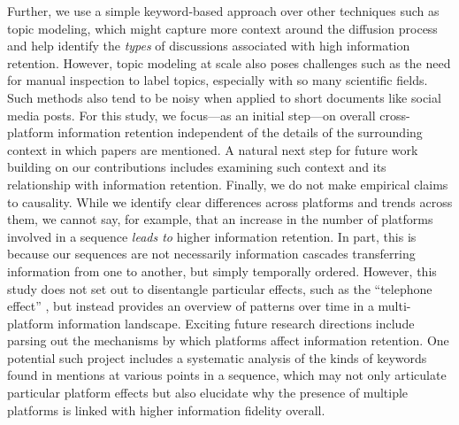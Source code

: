 \documentclass[letterpaper]{article} %
\begin{document}
Further, we use a simple keyword-based approach over other techniques such as topic modeling, which might capture more context around the diffusion process and help identify the \textit{types} of discussions associated with high information retention. However, topic modeling at scale also poses challenges such as the need for manual inspection to label topics, especially with so many scientific fields. Such methods also tend to be noisy when applied to short documents like social media posts. For this study, we focus---as an initial step---on overall cross-platform information retention independent of the details of the surrounding context in which papers are mentioned. A natural next step for future work building on our contributions includes examining such context and its relationship with information retention.  Finally, we do not make empirical claims to causality. While we identify clear differences across platforms and trends across them, we cannot say, for example, that an increase in the number of platforms involved in a sequence \emph{leads to} higher information retention. In part, this is because our sequences are not necessarily information cascades transferring information from one to another, but simply temporally ordered. However, this study does not set out to disentangle particular effects, such as the ``telephone effect'' \citep{ribeiroMessageDistortionInformation2019}, but instead provides an overview of patterns over time in a multi-platform information landscape. Exciting future research directions include parsing out the mechanisms by which platforms affect information retention. One potential such project includes a systematic analysis of the kinds of keywords found in mentions at various points in a sequence, which may not only articulate particular platform effects but also elucidate why the presence of multiple platforms is linked with higher information fidelity overall.

\vspace{-1.07mm}
\end{document}
